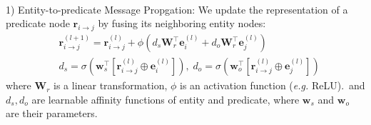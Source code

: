 \paragraph{}{1) Entity-to-predicate Message Propgation:}
We update the representation of a predicate node $\mathbf{r}_{i\to  j}$ by fusing its neighboring entity nodes:
\begin{align}
    &\mathbf{r}_{i\to  j}^{(l+1)} = \mathbf{r}_{i\to  j}^{(l)} + 
        \phi (
                d_{s} \mathbf{W}_{r}^\intercal \mathbf{e}_{i}^{(l)}+d_{o} \mathbf{W}_{r}^\intercal \mathbf{e}_{j}^{(l)}
        )\\
       &d_{s}= \sigma(\mathbf{w}_{s}^\intercal[\mathbf{r}_{i\to  j}^{(l)}\oplus\mathbf{e}_i^{(l)}]), \;
       d_{o}= \sigma(\mathbf{w}_{o}^\intercal[\mathbf{r}_{i\to  j}^{(l)}\oplus\mathbf{e}_j^{(l)}])
\end{align}
where $\mathbf{W}_r$ is a linear transformation, $\phi$ is an activation function (\textit{e.g.} ReLU).\, and $d_s, d_o$ are learnable affinity functions of entity and predicate, where $\mathbf{w}_{s}$ and $\mathbf{w}_{o}$ are their parameters.

